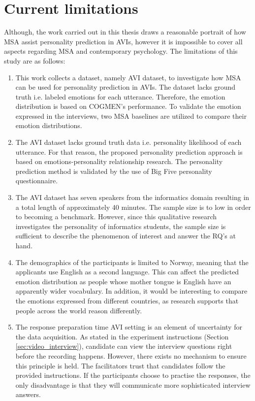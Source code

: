 \section{Current limitations}
\label{sec:current_limitations}
Although, the work carried out in this thesis draws a reasonable portrait of how MSA assist personality prediction in AVIs, however it is impossible to cover all aspects regarding MSA and contemporary psychology. The limitations of this study are as follows:
%
\begin{enumerate}
    \item This work collects a dataset, namely AVI dataset, to investigate how MSA can be used for personality prediction in AVIs. The dataset lacks ground truth i.e. labeled emotions for each utterance. Therefore, the emotion distribution is based on COGMEN's performance. To validate the emotion expressed in the interviews, two MSA baselines are utilized to compare their emotion distributions. 
    \item The AVI dataset lacks ground truth data i.e. personality likelihood of each utterance. For that reason, the proposed personality prediction approach is based on emotions-personality relationship research. The personality prediction method is validated by the use of Big Five personality questionnaire. 
    \item The AVI dataset has seven speakers from the informatics domain resulting in a total length of approximately 40 minutes. The sample size is to low in order to becoming a benchmark. However, since this qualitative research investigates the personality of informatics students, the sample size is sufficient to describe the phenomenon of interest and answer the RQ's at hand. 
    \item The demographics of the participants is limited to Norway, meaning that the applicants use English as a second language. This can affect the predicted emotion distribution as people whose mother tongue is English have an apparently wider vocabulary. In addition, it would be interesting to compare the emotions expressed from different countries, as research supports that people across the world reason differently. 
    \item The response preparation time AVI setting is an element of uncertainty for the data acquisition. As stated in the experiment instructions (Section \ref{sec:video_interview}), candidate can view the interview questions right before the recording happens. However, there exists no mechanism to ensure this principle is held. The facilitators trust that candidates follow the provided instructions. If the participants choose to practise the responses, the only disadvantage is that they will communicate more sophisticated interview answers. 
\end{enumerate}
%


